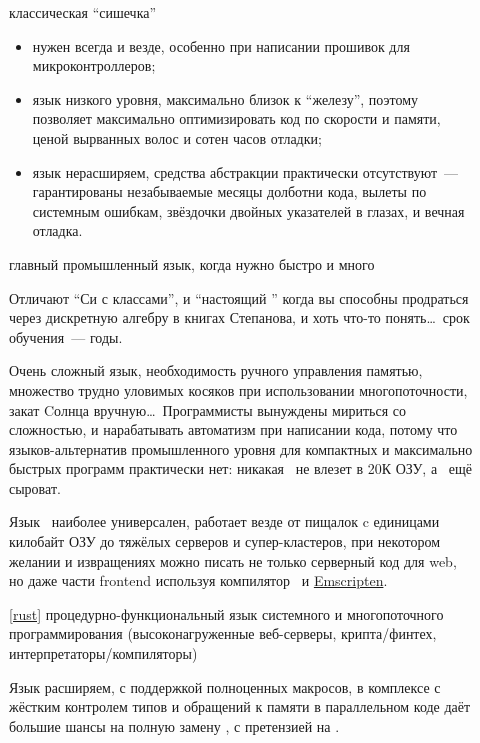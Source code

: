 \begin{description}

\item[\cb] классическая ``сишечка''

    \begin{itemize}[nosep]
    \item нужен всегда и везде, особенно при написании прошивок для
    микроконтроллеров;
    \item язык низкого уровня, максимально близок к ``железу'', поэтому
    позволяет максимально оптимизировать код по скорости и памяти, ценой
    вырванных волос и сотен часов отладки;
    \item язык нерасширяем, средства абстракции практически отсутствуют\ ---
    гарантированы незабываемые месяцы долботни кода, вылеты по системным
    ошибкам, звёздочки двойных указателей в глазах, и вечная отладка.
    \end{itemize}

\item[\cpp] главный промышленный язык, когда нужно быстро и много

    Отличают ``Си с классами'', и ``настоящий \cpp'' когда вы способны
    продраться через дискретную алгебру в книгах Степанова, и хоть что-то
    понять\dots\ срок обучения\ --- годы.

    Очень сложный язык, необходимость ручного управления памятью, множество
    трудно уловимых косяков при использовании многопоточности, закат Cолнца
    вручную\dots\ Программисты вынуждены мириться со сложностью, и нарабатывать
    автоматизм при написании кода, потому что языков-альтернатив промышленного
    уровня для компактных и максимально быстрых программ практически нет:
    никакая \java\ не влезет в 20К ОЗУ, а \rust\ ещё сыроват.

    Язык \cpp\ наиболее универсален, работает везде от пищалок c единицами
    килобайт ОЗУ до тяжёлых серверов и супер-кластеров, при некотором желании и
    извращениях можно писать не только серверный код для web, но даже части
    frontend используя компилятор \ и
    \href{https://emscripten.org/}{Emscripten}.

\item[\rust] \ref{rust} процедурно-функциональный язык системного и
многопоточного программирования (высоконагруженные веб-серверы, крипта/финтех,
интерпретаторы/компиляторы)

    Язык расширяем, с поддержкой полноценных макросов, в комплексе с жёстким
    контролем типов и обращений к памяти в параллельном коде даёт большие шансы
    на полную замену \cb, с претензией на \cpp.


\end{description}

